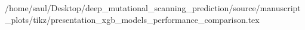 /home/saul/Desktop/deep_mutational_scanning_prediction/source/manuscript_plots/tikz/presentation_xgb_models_performance_comparison.tex